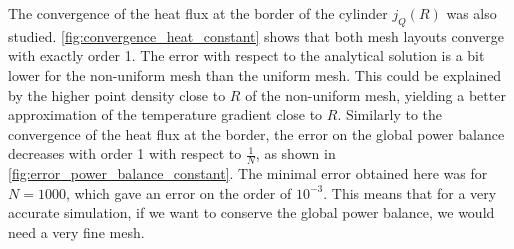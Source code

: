 The convergence of the heat flux at the border of the cylinder \(j_Q(R)\) was also studied. \autoref{fig:convergence_heat_constant} shows that both mesh layouts converge with exactly order 1. The error with respect to the analytical solution is a bit lower for the non-uniform mesh than the uniform mesh. This could be explained by the higher point density close to \(R\) of the non-uniform mesh, yielding a better approximation of the temperature gradient close to \(R\). Similarly to the convergence of the heat flux at the border, the error on the global power balance decreases with order 1 with respect to \(\frac{1}{N}\), as shown in \autoref{fig:error_power_balance_constant}. The minimal error obtained here was for \(N = 1000\), which gave an error on the order of \(10^{-3}\). This means that for a very accurate simulation, if we want to conserve the global power balance, we would need a very fine mesh.

